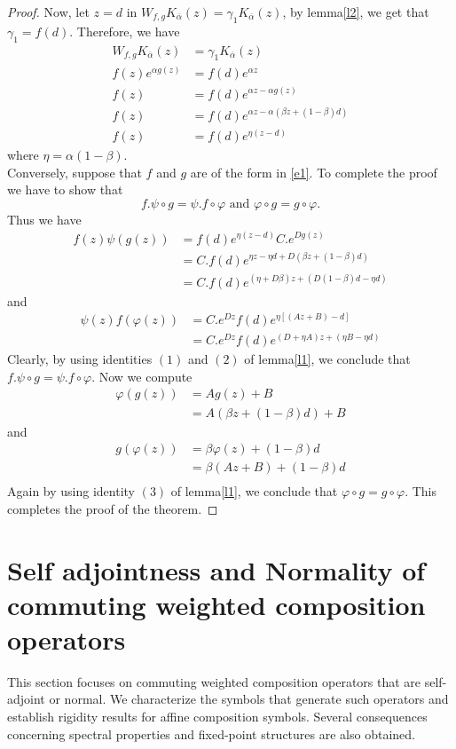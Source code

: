 \documentclass[reqno]{amsart}
\theoremstyle{remark}
\theoremstyle{Definition}
\theoremstyle{remark}
\numberwithin{equation}{section}
\begin{document}
\begin{proof}
Now, let $z=d$ in  $W_{f,g}K_{\overline{\alpha}}(z)= \gamma_{1}K_{\overline{\alpha}}(z)$, by lemma\ref{l2}, we get that $\gamma_{1}=f(d)$. Therefore, we have
\begin{align*}
    W_{f,g}K_{\overline{\alpha}}(z)&= \gamma_{1}K_{\overline{\alpha}}(z)\\
   f(z)e^{\alpha g(z)}&=f(d)e^{\alpha z} \\
   f(z)&= f(d)e^{\alpha z-\alpha g(z)}\\
   f(z)&= f(d) e^{\alpha z-\alpha(\beta z+ (1-\beta) d)}\\
   f(z)&= f(d) e^{\eta(z-d)}
\end{align*}
where $\eta = \alpha(1-\beta)$.\\
Conversely, suppose that $f$ and $g$ are of the form in \eqref{e1}. To complete the proof we have to show that 
$$f.\psi \circ g = \psi. f\circ \varphi \text{ and }\varphi \circ g= g\circ \varphi.$$
Thus we have 
\begin{align*}
 f(z)\psi (g(z)) &= f(d) e^{\eta(z-d)} C. e^{Dg(z)}\\
 &= C.f(d)e^{\eta z-\eta d+D(\beta z +(1-\beta)d)}\\
 &= C.f(d)e^{(\eta+D\beta)z+(D(1-\beta)d-\eta d)}
\end{align*}
and 
\begin{align*}
    \psi(z) f( \varphi (z))&= C. e^{Dz} f(d)e^{\eta [(Az+B)-d]}\\
    &= C. e^{Dz} f(d) e^{(D+\eta A)z+(\eta B-\eta d)}
\end{align*}
Clearly, by using identities $(1)$ and $(2)$ of lemma\ref{l1}, we conclude that $f.\psi \circ g = \psi. f\circ \varphi $. Now we compute
\begin{align*}
    \varphi( g(z))&= Ag(z)+B\\
    &= A(\beta z+ (1-\beta) d)+B
\end{align*}
and 
\begin{align*}
    g(\varphi(z))&= \beta \varphi(z)+ (1-\beta) d\\
    &= \beta (Az+B)+(1-\beta) d\\
\end{align*}
Again by using identity $(3)$ of lemma\ref{l1}, we conclude that $\varphi \circ g= g\circ \varphi.$ This completes the proof of the theorem.
\end{proof}




\section{Self adjointness and Normality of commuting weighted composition operators}
This section focuses on commuting weighted composition operators that are self-adjoint or normal. We characterize the symbols that generate such operators and establish rigidity results for affine composition symbols. Several consequences concerning spectral properties and fixed-point structures are also obtained.
\end{document}
